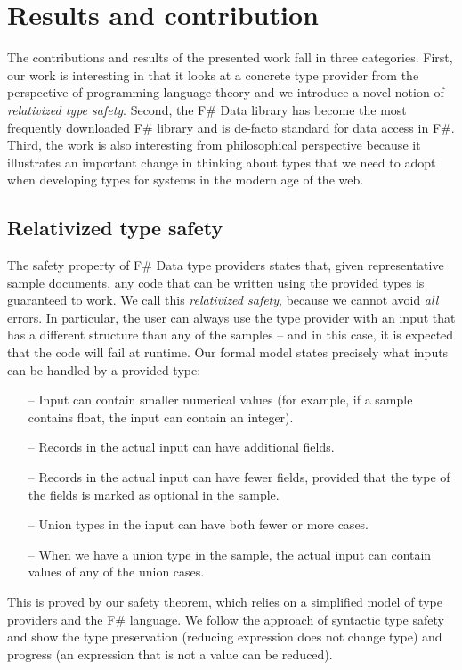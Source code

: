 \documentclass[preprint]{sigplanconf}
\begin{document}

\section{Results and contribution}

The contributions and results of the presented work fall in three categories. First, our work is
interesting in that it looks at a concrete type provider from the perspective of programming language
theory and we introduce a novel notion of \emph{relativized type safety}. Second, the F\# Data library
has become the most frequently downloaded F\# library and is de-facto standard for data access in F\#.
Third, the work is also interesting from philosophical perspective because it illustrates an important
change in thinking about types that we need to adopt when developing types for systems in the
modern age of the web.

\subsection{Relativized type safety}

The safety property of F\# Data type providers states that, given representative sample documents,
any code that can be written using the provided types is guaranteed to work. We call this
\emph{relativized safety}, because we cannot avoid \emph{all} errors. In particular, the user can
always use the type provider with an input that has a different structure than any of the samples --
and in this case, it is expected that the code will fail at runtime. Our formal model
\cite{fsharp-data-paper} states precisely what inputs can be handled by a provided type:
%
\begin{itemize}[noitemsep]
\item[--] Input can contain smaller numerical values (for example, if a sample contains float, the input can contain an integer).
\item[--] Records in the actual input can have additional fields.
\item[--] Records in the actual input can have fewer fields, provided that the type of the fields is marked as optional in the sample.
\item[--] Union types in the input can have both fewer or more cases.
\item[--] When we have a union type in the sample, the actual input can contain values of any of the union cases.
\end{itemize}
%
This is proved by our safety theorem, which relies on a simplified model of type providers and the
F\# language. We follow the approach of syntactic type safety \cite{syntactic} and show the type
preservation (reducing expression does not change type) and progress (an expression that is not a
value can be reduced).
\end{document}
